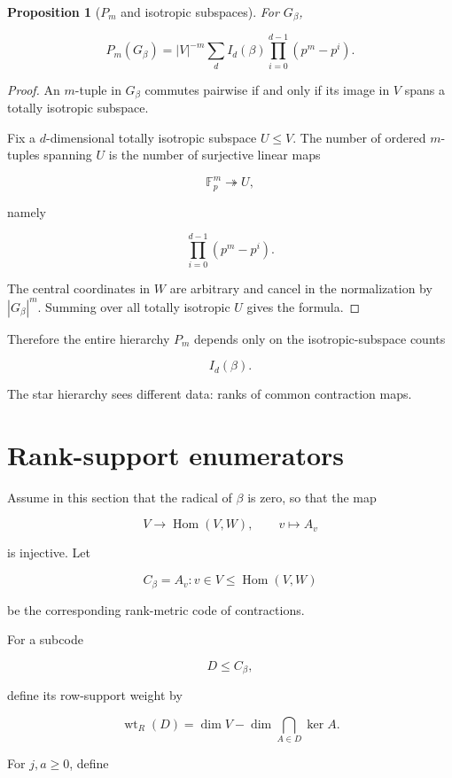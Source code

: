 \documentclass[11pt]{article}
\newtheorem{proposition}[theorem]{Proposition}
\begin{document}
\begin{proposition}[$P_m$ and isotropic subspaces]

For $G_\beta$,

\[
P_m(G_\beta)
=|V|^{-m}
\sum_d
I_d(\beta)
\prod_{i=0}^{d-1}(p^m-p^i).
\]

\end{proposition}
\begin{proof}

An $m$-tuple in $G_\beta$ commutes pairwise if and only if its image in $V$ spans a totally isotropic subspace.

Fix a $d$-dimensional totally isotropic subspace $U\le V$. The number of ordered $m$-tuples spanning $U$ is the number of surjective linear maps

\[
\mathbb F_p^m\twoheadrightarrow U,
\]

namely

\[
\prod_{i=0}^{d-1}(p^m-p^i).
\]

The central coordinates in $W$ are arbitrary and cancel in the normalization by $|G_\beta|^m$. Summing over all totally isotropic $U$ gives the formula.
\end{proof}

Therefore the entire hierarchy $P_m$ depends only on the isotropic-subspace counts

\[
I_d(\beta).
\]

The star hierarchy sees different data: ranks of common contraction maps.

\section{Rank-support enumerators}

Assume in this section that the radical of $\beta$ is zero, so that the map

\[
V\to\operatorname{Hom}(V,W),
\qquad
v\mapsto A_v
\]

is injective. Let

\[
C_\beta={A_v:v\in V}\le\operatorname{Hom}(V,W)
\]

be the corresponding rank-metric code of contractions.

For a subcode

\[
D\le C_\beta,
\]

define its row-support weight by

\[
\operatorname{wt}_R(D)=
\dim V-\dim\bigcap_{A\in D}\ker A.
\]

For $j,a\ge0$, define
\end{document}
